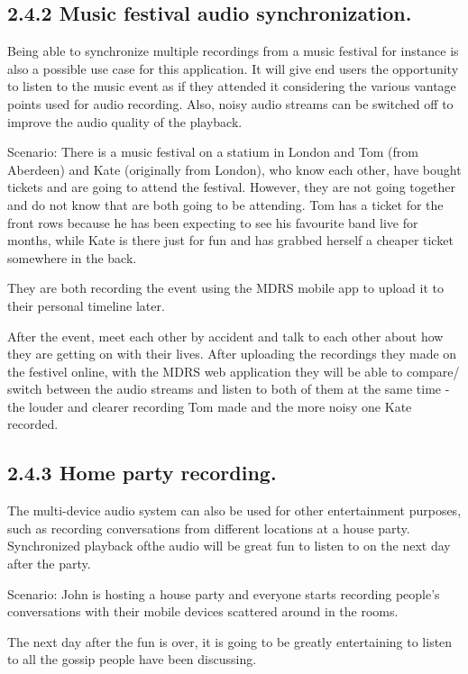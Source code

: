 \documentclass{l3proj}
\begin{document}
\subsection{2.4.2 Music festival audio synchronization.} Being able to synchronize multiple recordings from a music festival for instance is also a possible use case for this application. It will give end users the opportunity to listen to the music event as if they attended it considering the various vantage points used for audio recording. Also, noisy audio streams can be switched off to improve the audio quality of the playback.

Scenario: There is a music festival on a statium in London and Tom (from Aberdeen) and Kate (originally from London), who know each other, have bought tickets and are going to attend the festival. However, they are not going together and do not know that are both going to be attending. Tom has a ticket for the front rows because he has been expecting to see his favourite band live for months, while Kate is there just for fun and has grabbed herself a cheaper ticket somewhere in the back.

They are both recording the event using the MDRS mobile app to upload it to their personal timeline later.

After the event, meet each other by accident and talk to each other about how they are getting on with their lives. After uploading the recordings they made on the festivel online, with the MDRS web application they will be able to compare/ switch between the audio streams and listen to both of them at the same time - the louder and clearer recording Tom made and the more noisy one Kate recorded.

\subsection{2.4.3 Home party recording.} The multi-device audio system can also be used for other entertainment purposes, such as recording conversations from different locations at a house party. Synchronized playback ofthe audio will be great fun to listen to on the next day after the party.

Scenario: John is hosting a house party and everyone starts recording people’s conversations with their mobile devices scattered around in the rooms.

The next day after the fun is over, it is going to be greatly entertaining to listen to all the gossip people have been discussing.
\end{document}
